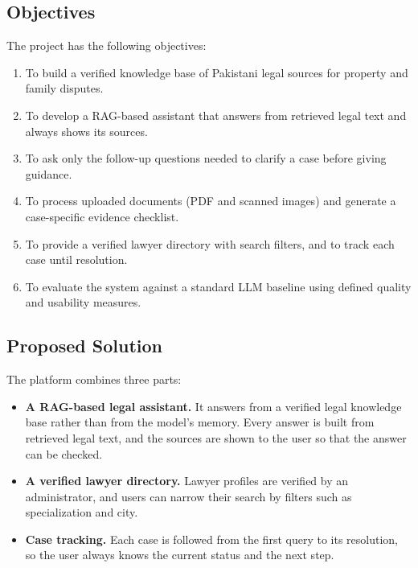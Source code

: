 \documentclass[12pt,a4paper]{report}
\begin{document}
\subsection{Objectives}
The project has the following objectives:
\begin{enumerate}
  \item To build a verified knowledge base of Pakistani legal sources for property and family disputes.
  \item To develop a RAG-based assistant that answers from retrieved legal text and always shows its sources.
  \item To ask only the follow-up questions needed to clarify a case before giving guidance.
  \item To process uploaded documents (PDF and scanned images) and generate a case-specific evidence checklist.
  \item To provide a verified lawyer directory with search filters, and to track each case until resolution.
  \item To evaluate the system against a standard LLM baseline using defined quality and usability measures.
\end{enumerate}

\subsection{Proposed Solution}
The platform combines three parts:
\begin{itemize}
  \item \textbf{A RAG-based legal assistant.} It answers from a verified legal knowledge base rather than from the model's memory. Every answer is built from retrieved legal text, and the sources are shown to the user so that the answer can be checked.
  \item \textbf{A verified lawyer directory.} Lawyer profiles are verified by an administrator, and users can narrow their search by filters such as specialization and city.
  \item \textbf{Case tracking.} Each case is followed from the first query to its resolution, so the user always knows the current status and the next step.
\end{itemize}
\end{document}
